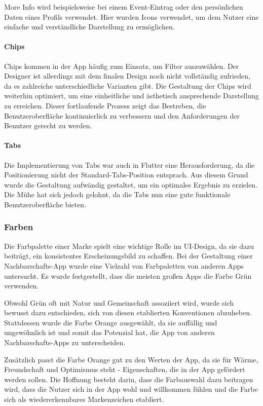 More Info wird beispielsweise bei einem Event-Eintrag oder
den persönlichen Daten eines Profils verwendet. Hier wurden
Icons verwendet, um dem Nutzer eine einfache und
verständliche Darstellung zu ermöglichen.

\paragraph{Chips}
Chips kommen in der App häufig zum Einsatz, um Filter auszuwählen. Der Designer ist allerdings mit dem finalen Design noch nicht vollständig zufrieden, da es zahlreiche unterschiedliche Varianten gibt. Die Gestaltung der Chips wird weiterhin optimiert, um eine einheitliche und ästhetisch ansprechende Darstellung zu erreichen. Dieser fortlaufende Prozess zeigt das Bestreben, die Benutzeroberfläche kontinuierlich zu verbessern und den Anforderungen der Benutzer gerecht zu werden.

\paragraph{Tabs}
Die Implementierung von Tabs war auch in Flutter eine
Herausforderung, da die Positionierung nicht der
Standard-Tabs-Position entsprach. Aus diesem Grund wurde die
Gestaltung aufwändig gestaltet, um ein optimales Ergebnis zu
erzielen. Die Mühe hat sich jedoch gelohnt, da die Tabs nun
eine gute funktionale Benutzeroberfläche bieten.

\subsubsection{Farben}
Die Farbpalette einer Marke spielt eine wichtige Rolle im UI-Design, da sie dazu beiträgt, ein konsistentes Erscheinungsbild zu schaffen. Bei der Gestaltung einer Nachbarschafts-App wurde eine Vielzahl von Farbpaletten von anderen Apps untersucht. Es wurde festgestellt, dass die meisten großen Apps die Farbe Grün verwenden.

Obwohl Grün oft mit Natur und Gemeinschaft assoziiert wird, wurde sich bewusst dazu entschieden, sich von diesen etablierten Konventionen abzuheben. Stattdessen wurde die Farbe Orange ausgewählt, da sie auffällig und ungewöhnlich ist und somit das Potenzial hat, die App von anderen Nachbarschafts-Apps zu unterscheiden.

Zusätzlich passt die Farbe Orange gut zu den Werten der App, da sie für Wärme, Freundschaft und Optimismus steht - Eigenschaften, die in der App gefördert werden sollen. Die Hoffnung besteht darin, dass die Farbauswahl dazu beitragen wird, dass die Nutzer sich in der App wohl und willkommen fühlen und die Farbe sich als wiedererkennbares Markenzeichen etabliert.


